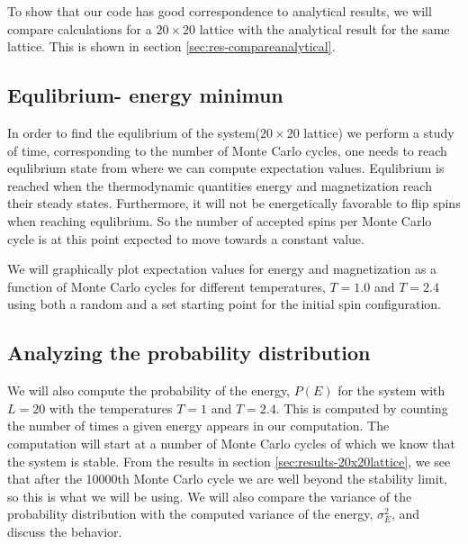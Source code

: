 \documentclass[../main.tex]{subfiles}
\begin{document}

To show that our code has good correspondence to analytical results, we will compare calculations for a $20\times 20$ lattice with the analytical result for the same lattice. This is shown in section \ref{sec:res-compareanalytical}.

\subsection{Equlibrium- energy minimun}
In order to find the equlibrium of the system($20\times 20$ lattice) we perform a study of time, corresponding to the number of Monte Carlo cycles, one needs to reach equlibrium state from where we can compute expectation values. Equlibrium is reached when the thermodynamic quantities energy and magnetization reach their steady states. Furthermore, it will not be energetically favorable to flip spins when reaching equlibrium. So the number of accepted spins per Monte Carlo cycle is at this point expected to move towards a constant value.

\noindent We will graphically plot expectation values for energy and magnetization as a function of Monte Carlo cycles for different temperatures, $T=1.0$ and $T= 2.4$ using both a random and a set starting point for the initial spin configuration.

\subsection{Analyzing the probability distribution}
We will also compute the probability of the energy, $P(E)$ for the system with $L = 20$ with the temperatures $T= 1$ and $T= 2.4$. This is computed by counting the number of times a given energy appears in our computation. The computation will start at a number of Monte Carlo cycles of which we know that the system is stable. From the results in section \ref{sec:results-20x20lattice}, we see that after the 10000th Monte Carlo cycle we are well beyond the stability limit, so this is what we will be using. We will also compare the variance of the probability distribution with the computed variance of the energy, $\sigma_E^2$, and discuss the behavior.

\end{document}
